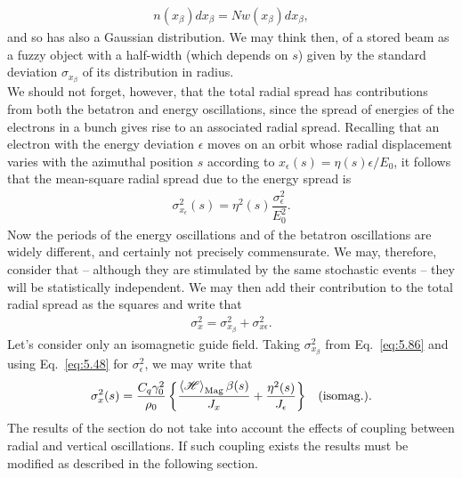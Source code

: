 \begin{align*}
	n(x_\beta)dx_\beta = Nw(x_\beta)dx_\beta,
\end{align*}
and so has also a Gaussian distribution. We may think then, of a stored beam as a fuzzy object with a half-width (which depends on $s$) given by the standard deviation $\sigma_{x_\beta}$ of its distribution in radius.\\
We should not forget, however, that the total radial spread has contributions from both the betatron and energy oscillations, since the spread of energies of the electrons in a bunch gives rise to an associated radial spread. Recalling that an electron with the energy deviation $\epsilon$ moves on an orbit whose radial displacement varies with the azimuthal position $s$ according to $x_\epsilon(s) = \eta(s) \epsilon/E_0$, it follows that the mean-square radial spread due to the energy spread is
\begin{align}
	\sigma_{x_\epsilon}^2(s) = \eta^2(s) \dfrac{\sigma_\epsilon^2}{E_0^2}.
\end{align}
Now the periods of the energy oscillations and of the betatron oscillations are widely different, and certainly not precisely commensurate. We may, therefore, consider that -- although they are stimulated by the same stochastic events -- they will be statistically independent. We may then add their contribution to the total
radial spread as the squares and write that
\begin{align}
	\sigma_x^2 = \sigma_{x_\beta}^2 + \sigma_{x\epsilon}^2.
\end{align}
Let's consider only an isomagnetic guide field. Taking $\sigma_{x_\beta}^2$ from Eq.~\eqref{eq:5.86} and using Eq.~\eqref{eq:5.48} for $\sigma_\epsilon^2$, we may write that
\begin{align}
	\sigma_x^2(s) = \dfrac{C_q\gamma_0^2}{\rho_0} \left\lbrace \dfrac{\left< \mathscr{H} \right>_\text{Mag} \beta(s)}{J_x} + \dfrac{\eta^2(s)}{J_\epsilon} \right\rbrace && \text{(isomag.)}.
\end{align}
The results of the section do not take into account the effects of coupling between radial and vertical oscillations. If such coupling exists the results must be modified as described in the following section.
